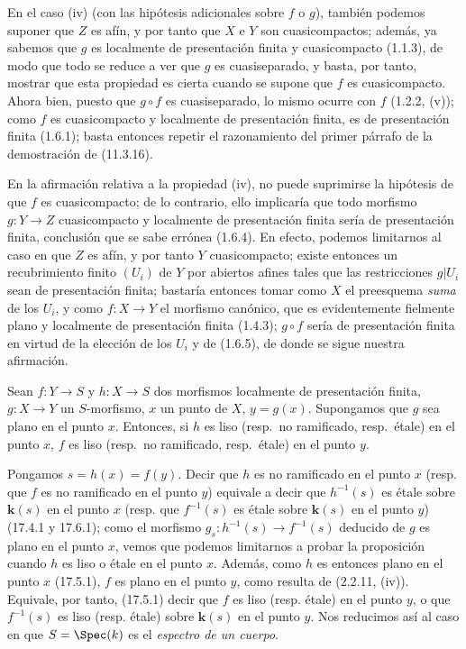 En el caso (iv) (con las hipótesis adicionales sobre $f$ o $g$), también podemos suponer que $Z$ es afín, y por tanto que $X$ e $Y$ son cuasicompactos; además, ya sabemos que $g$ es localmente de presentación finita y cuasicompacto (1.1.3), de modo que todo se reduce a ver que $g$ es cuasiseparado, y basta, por tanto, mostrar que esta propiedad es cierta cuando se supone que $f$ es cuasicompacto. Ahora bien, puesto que $g\circ f$ es cuasiseparado, lo mismo ocurre con $f$ (1.2.2, (v)); como $f$ es cuasicompacto y localmente de presentación finita, es de presentación finita (1.6.1); basta entonces repetir el razonamiento del primer párrafo de la demostración de (11.3.16).

\begin{remark}[17.7.6]
\label{IV.17.7.6}
En la afirmación relativa a la propiedad (iv), no puede suprimirse la hipótesis de que $f$ es cuasicompacto; de lo contrario, ello implicaría que todo morfismo $g:Y\to Z$ cuasicompacto y localmente de presentación finita sería de presentación finita, conclusión que se sabe errónea (1.6.4). En efecto, podemos limitarnos al caso en que $Z$ es afín, y por tanto $Y$ cuasicompacto; existe entonces un recubrimiento finito $(U_i)$ de $Y$ por abiertos afines tales que las restricciones $g|U_i$ sean de presentación finita; bastaría entonces tomar como $X$ el preesquema \emph{suma} de los $U_i$, y como $f:X\to Y$ el morfismo canónico, que es evidentemente fielmente plano y localmente de presentación finita (1.4.3); $g\circ f$ sería de presentación finita en virtud de la elección de los $U_i$ y de (1.6.5), de donde se sigue nuestra afirmación.
\end{remark}

\begin{proposition}[17.7.7]
\label{IV.17.7.7}
Sean $f:Y\to S$ y $h:X\to S$ dos morfismos localmente de presentación finita, $g:X\to Y$ un $S$-morfismo, $x$ un punto de $X$, $y=g(x)$. Supongamos que $g$ sea \textup{plano} en el punto $x$. Entonces, si $h$ es liso \textup{(resp.}\ no ramificado, \textup{resp.}\ étale\textup{)} en el punto $x$, $f$ es liso \textup{(resp.}\ no ramificado, \textup{resp.}\ étale\textup{)} en el punto $y$.
\end{proposition}

Pongamos $s=h(x)=f(y)$. Decir que $h$ es no ramificado en el punto $x$ (resp. que $f$ es no ramificado en el punto $y$) equivale a decir que $h^{-1}(s)$ es étale sobre $\boldsymbol k(s)$ en el punto $x$ (resp. que $f^{-1}(s)$ es étale sobre $\boldsymbol k(s)$ en el punto $y$) (17.4.1 y 17.6.1); como el morfismo $g_s:h^{-1}(s)\to f^{-1}(s)$ deducido de $g$ es plano en el punto $x$, vemos que podemos limitarnos a probar la proposición cuando $h$ es liso o étale en el punto $x$. Además, como $h$ es entonces plano en el punto $x$ (17.5.1), $f$ es plano en el punto $y$, como resulta de (2.2.11, (iv)). Equivale, por tanto, (17.5.1) decir que $f$ es liso (resp. étale) en el punto $y$, o que $f^{-1}(s)$ es liso (resp. étale) sobre $\boldsymbol k(s)$ en el punto $y$. Nos reducimos así al caso en que $S=\Spec(k)$ es el \emph{espectro de un cuerpo}.


